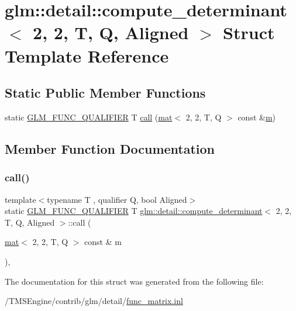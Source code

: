 \hypertarget{structglm_1_1detail_1_1compute__determinant_3_012_00_012_00_01_t_00_01_q_00_01_aligned_01_4}{}\section{glm\+:\+:detail\+:\+:compute\+\_\+determinant$<$ 2, 2, T, Q, Aligned $>$ Struct Template Reference}
\label{structglm_1_1detail_1_1compute__determinant_3_012_00_012_00_01_t_00_01_q_00_01_aligned_01_4}
\subsection*{Static Public Member Functions}
\begin{DoxyCompactItemize}
\item 
static \hyperlink{setup_8hpp_a33fdea6f91c5f834105f7415e2a64407}{G\+L\+M\+\_\+\+F\+U\+N\+C\+\_\+\+Q\+U\+A\+L\+I\+F\+I\+ER} T \hyperlink{structglm_1_1detail_1_1compute__determinant_3_012_00_012_00_01_t_00_01_q_00_01_aligned_01_4_a850cf8b2da3cde11c2b1c3c972927d6d}{call} (\hyperlink{structglm_1_1mat}{mat}$<$ 2, 2, T, Q $>$ const \&\hyperlink{_s_d_l__opengl__glext_8h_af593500c283bf1a787a6f947f503a5c2}{m})
\end{DoxyCompactItemize}


\subsection{Member Function Documentation}
\mbox{\label{structglm_1_1detail_1_1compute__determinant_3_012_00_012_00_01_t_00_01_q_00_01_aligned_01_4_a850cf8b2da3cde11c2b1c3c972927d6d}} 
\subsubsection{\texorpdfstring{call()}{call()}}
{\footnotesize\ttfamily template$<$typename T , qualifier Q, bool Aligned$>$ \\
static \hyperlink{setup_8hpp_a33fdea6f91c5f834105f7415e2a64407}{G\+L\+M\+\_\+\+F\+U\+N\+C\+\_\+\+Q\+U\+A\+L\+I\+F\+I\+ER} T \hyperlink{structglm_1_1detail_1_1compute__determinant}{glm\+::detail\+::compute\+\_\+determinant}$<$ 2, 2, T, Q, Aligned $>$\+::call (\begin{DoxyParamCaption}\item[{\hyperlink{structglm_1_1mat}{mat}$<$ 2, 2, T, Q $>$ const \&}]{m }\end{DoxyParamCaption})\hspace{0.3cm}{\ttfamily [inline]}, {\ttfamily [static]}}



The documentation for this struct was generated from the following file\+:\begin{DoxyCompactItemize}
\item 
/\+T\+M\+S\+Engine/contrib/glm/detail/\hyperlink{func__matrix_8inl}{func\+\_\+matrix.\+inl}\end{DoxyCompactItemize}
